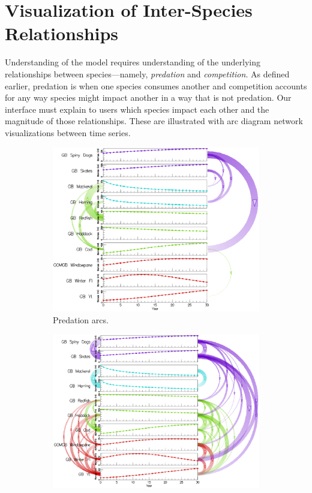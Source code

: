 \section{Visualization of Inter-Species Relationships}
\label{sec:arc}

Understanding of the model requires understanding of the underlying relationships between species---namely, \textit{predation} and \textit{competition}.  As defined earlier, predation is when one species consumes another and competition accounts for any way species might impact another in a way that is not predation.  Our interface must explain to users which species impact each other and the magnitude of those relationships.  These are illustrated with arc diagram network visualizations between time series.  

\begin{figure}
\centering
	\begin{subfigure}[b]{0.33\textwidth}
		\centering
		\includegraphics[width=1\textwidth]{figures/eps/arcs_predation.eps}
		\caption{Predation arcs.}
		\label{fig:arcsPredation}
	\end{subfigure}	
	\begin{subfigure}[b]{0.33\textwidth}
		\centering
		\includegraphics[width=1\textwidth]{figures/eps/arcs_interaction.eps}

\end{subfigure}
\end{figure}
